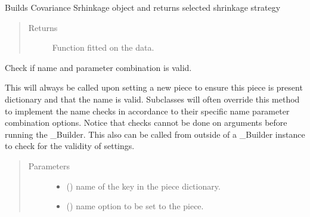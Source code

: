 \documentclass[letterpaper,10pt,english]{sphinxmanual}
\begin{document}
\begin{fulllineitems}
\begin{fulllineitems}
\label{\detokenize{dalio.pipe:dalio.pipe.builders.CovShrink.build_model}}
Builds Covariance Srhinkage object and returns selected shrinkage
strategy
\begin{quote}\begin{description}
\item[{Returns}] \leavevmode
Function fitted on the data.

\end{description}\end{quote}

\end{fulllineitems}


\begin{fulllineitems}
\label{\detokenize{dalio.pipe:dalio.pipe.builders.CovShrink.check_name}}
Check if name and parameter combination is valid.

This will always be called upon setting a new piece to ensure this
piece is present dictionary and that the name is valid. Subclasses
will often override this method to implement the name checks in
accordance to their specific name parameter combination options.
Notice that checks cannot be done on arguments before running the
\_Builder. This also can be called from outside of a \_Builder instance
to check for the validity of settings.
\begin{quote}\begin{description}
\item[{Parameters}] \leavevmode\begin{itemize}
\item {} 
 () \textendash{} name of the key in the piece dictionary.

\item {} 
 () \textendash{} name option to be set to the piece.

\end{itemize}

\end{description}\end{quote}


\end{fulllineitems}
\end{fulllineitems}
\end{document}
